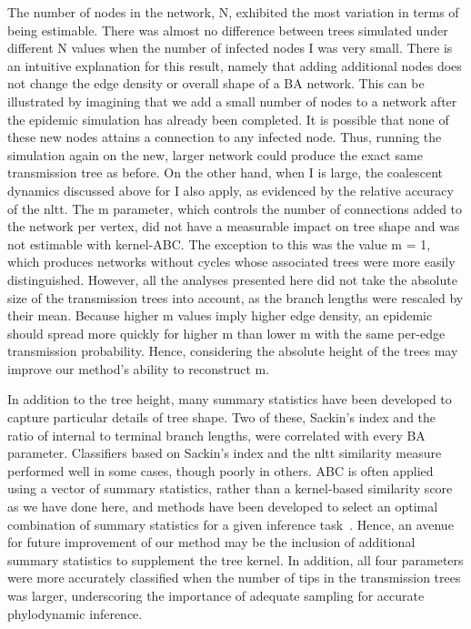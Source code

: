 The number of nodes in the network, \gls{N}, exhibited the most variation in
terms of being estimable. There was almost no difference between trees
simulated under different \gls{N} values when the number of infected nodes
\gls{I} was very small. There is an intuitive explanation for this result,
namely that adding additional nodes does not change the edge density or overall
shape of a \gls{BA} network. This can be illustrated by imagining that we add a
small number of nodes to a network after the epidemic simulation has already
been completed. It is possible that none of these new nodes attains a
connection to any infected node. Thus, running the simulation again on the new,
larger network could produce the exact same transmission tree as before. On the
other hand, when \gls{I} is large, the coalescent dynamics discussed above for
\gls{I} also apply, as evidenced by the relative accuracy of the \gls{nltt}.
The \gls{m} parameter, which controls the number of connections added to the
network per vertex, did not have a measurable impact on tree shape and was not
estimable with kernel-ABC. The exception to this was the value \gls{m} = 1,
which produces networks without cycles whose associated trees were more easily
distinguished. However, all the analyses presented here did not take the
absolute size of the transmission trees into account, as the branch lengths
were rescaled by their mean. Because higher \gls{m} values imply higher edge
density, an epidemic should spread more quickly for higher \gls{m} than lower
\gls{m} with the same per-edge transmission probability.  Hence, considering
the absolute height of the trees may improve our method's ability to
reconstruct \gls{m}.

In addition to the tree height, many summary statistics have been developed to
capture particular details of tree shape. Two of these, Sackin's index and the
ratio of internal to terminal branch lengths, were correlated with every
\gls{BA} parameter. Classifiers based on Sackin's index and the \gls{nltt}
similarity measure performed well in some cases, though poorly in others.
\gls{ABC} is often applied using a vector of summary statistics, rather than a
kernel-based similarity score as we have done here, and methods have been
developed to select an optimal combination of summary statistics for a given
inference task~\autocite{fearnhead2012constructing}. Hence, an avenue for
future improvement of our method may be the inclusion of additional summary
statistics to supplement the tree kernel. In addition, all four parameters were
more accurately classified when the number of tips in the transmission trees
was larger, underscoring the importance of adequate sampling for accurate
phylodynamic inference.

